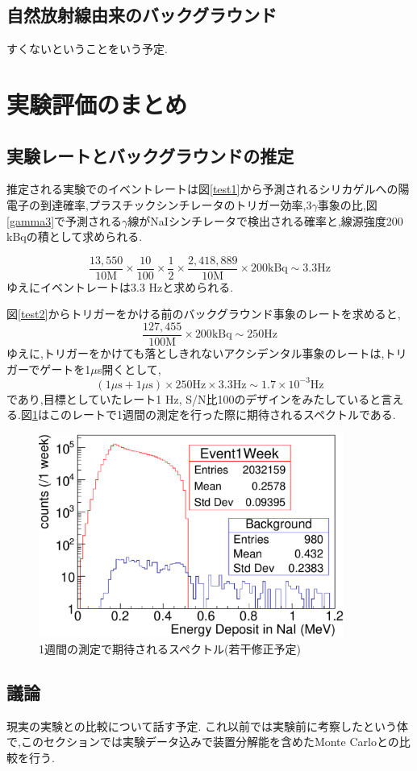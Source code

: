 \subsection{自然放射線由来のバックグラウンド}
すくないということをいう予定.

\section{実験評価のまとめ}
\label{section_testall}

\subsection{実験レートとバックグラウンドの推定}
推定される実験でのイベントレートは図\ref{test1}から予測されるシリカゲルへの陽電子の到達確率,プラスチックシンチレータのトリガー効率,$3\gamma$事象の比,図\ref{gamma3}で予測される$\gamma$線がNaIシンチレータで検出される確率と,線源強度200 kBqの積として求められる.

\begin{equation}
	\frac{13,550}{10 \mathrm{M}} \times \frac{10}{100} \times \frac{1}{2} \times \frac{2,418,889}{10 \mathrm{M}} \times 200 \mathrm{ kBq} \sim 3.3 \mathrm{ Hz}
\end{equation}
ゆえにイベントレートは3.3 Hzと求められる.

図\ref{test2}からトリガーをかける前のバックグラウンド事象のレートを求めると,
\begin{equation}
	\frac{127,455}{100\mathrm{M}} \times 200 \mathrm{kBq} \sim 250 \mathrm{ Hz}
\end{equation}
ゆえに,トリガーをかけても落としきれないアクシデンタル事象のレートは,トリガーでゲートを1$\mu$s開くとして,
\begin{equation}
	( 1 \mu \mathrm{s} + 1 \mu \mathrm{s} ) \times  250 \mathrm{Hz} \times 3.3 \mathrm{Hz} \sim 1.7 \times 10^{-3} \mathrm{Hz}
\end{equation}
であり,目標としていたレート1 Hz, S/N比100のデザインをみたしていると言える.図\ref{test_all}はこのレートで1週間の測定を行った際に期待されるスペクトルである.

\begin{figure}[htbp]
	\centering
		\includegraphics[width=10cm]{fig/test_all.pdf}
	\caption{1週間の測定で期待されるスペクトル(若干修正予定)}
	\label{test_all}
\end{figure}

\subsection{議論}
\label{subsection_discussion}
現実の実験との比較について話す予定.
これ以前では実験前に考察したという体で,このセクションでは実験データ込みで装置分解能を含めたMonte Carloとの比較を行う.


